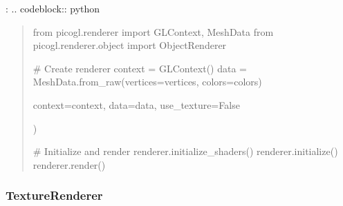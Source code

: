 \documentclass[a4paper,10pt,english,openany,oneside]{sphinxmanual}
\begin{document}
\sphinxAtStartPar
{}:
.. code\sphinxhyphen{}block:: python
\begin{quote}

\sphinxAtStartPar
from picogl.renderer import GLContext, MeshData
from picogl.renderer.object import ObjectRenderer

\sphinxAtStartPar
\# Create renderer
context = GLContext()
data = MeshData.from\_raw(vertices=vertices, colors=colors)
\begin{description}
\sphinxAtStartPar
context=context,
data=data,
use\_texture=False

\end{description}

\sphinxAtStartPar
)

\sphinxAtStartPar
\# Initialize and render
renderer.initialize\_shaders()
renderer.initialize()
renderer.render()
\end{quote}


\subsubsection{TextureRenderer}
\label{\detokenize{api/renderer:texturerenderer}}
\end{document}
